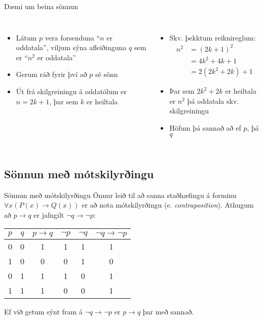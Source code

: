 \documentclass[handout]{beamer}
\begin{document}
\begin{frame}{Dæmi um beina sönnun}
    \begin{columns}
        \begin{itemize}[<+->]
            \item Látum $p$ vera forsenduna ``$n$ er oddatala'', viljum sýna afleiðinguna $q$ sem er ``$n^2$ er oddatala''
            \item Gerum ráð fyrir því að $p$ sé sönn
            \item Út frá skilgreiningu á oddatölum er $n = 2k+1$, þar sem $k$ er heiltala
        \end{itemize}
        \begin{itemize}[<+->]
            \item Skv. þekktum reiknireglum:
            \begin{align*}
                n^2 &= (2k+1)^2\\
                &=4k^2+4k+1\\
                &=2(2k^2+2k)+1
            \end{align*}
            \item Þar sem $2k^2+2k$ er heiltala er $n^2$ þá oddatala skv. skilgreiningu
            \item Höfum þá sannað að ef $p$, þá $q$
        \end{itemize}
    \end{columns}
\end{frame}

\subsection{Sönnun með mótskilyrðingu}

\begin{frame}{Sönnun með mótskilyrðingu}
    Önnur leið til að sanna staðhæfingu á forminu $\forall x (P(x) \to Q(x))$ er að nota mótskilyrðingu (e. \emph{contraposition}). Athugum að $p \to q$ er jafngilt $\lnot q \to \lnot p$:
    \begin{center}
        \begin{tabular}{cccccc}
            \toprule
            $p$&$q$&$p \to q$&$\lnot p$&$\lnot q$&$\lnot q \to \lnot p$\\
            \midrule
            0&0&1&1&1&1\\
            1&0&0&0&1&0\\
            0&1&1&1&0&1\\
            1&1&1&0&0&1\\
            \bottomrule
        \end{tabular}
    \end{center}
    Ef við getum sýnt fram á $\lnot q \to \lnot p$ er $p \to q$ þar með sannað.
\end{frame}
\end{document}
